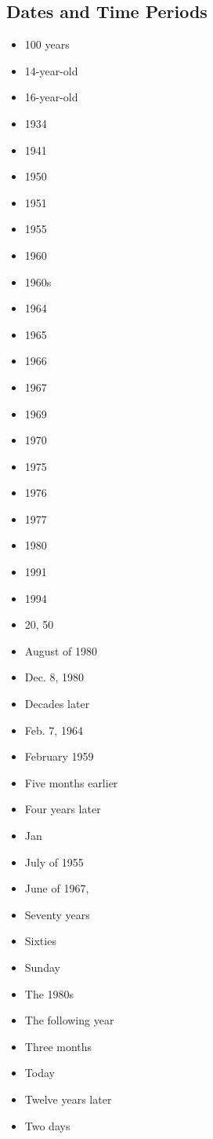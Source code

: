 \documentclass[12pt,a4paper]{article}
\begin{document}
\subsection{Dates and Time Periods}
\begin{itemize}
  \item 100 years
  \item 14-year-old
  \item 16-year-old
  \item 1934
  \item 1941
  \item 1950
  \item 1951
  \item 1955
  \item 1960
  \item 1960s
  \item 1964
  \item 1965
  \item 1966
  \item 1967
  \item 1969
  \item 1970
  \item 1975
  \item 1976
  \item 1977
  \item 1980
  \item 1991
  \item 1994
  \item 20, 50
  \item August of 1980
  \item Dec. 8, 1980
  \item Decades later
  \item Feb. 7, 1964
  \item February 1959
  \item Five months earlier
  \item Four years later
  \item Jan
  \item July of 1955
  \item June of 1967,
  \item Seventy years
  \item Sixties
  \item Sunday
  \item The 1980s
  \item The following year
  \item Three months
  \item Today
  \item Twelve years later
  \item Two days

\end{itemize}
\end{document}
